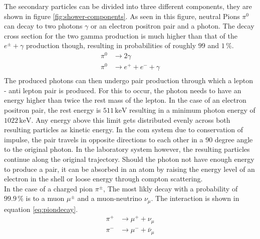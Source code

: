 \documentclass[abstract,toc,los,english,10pt,glossary,acronyms]{jluthesis}
\begin{document}
The secondary particles can be divided into three different components, they are shown in figure \ref{fig:shower-components}.
As seen in this figure, neutral Pions $\pi^0$ can decay to two photons $\gamma$ or an electron positron pair and a photon. The decay cross section for the two gamma production is much higher than that of the $e^\pm + \gamma$ production though, resulting in probabilities of roughly $99$ and $1\,\%$. 
\begin{equation}
	\begin{aligned}
		\pi^0 &\rightarrow 2\gamma \\
		\pi^0 &\rightarrow e^+ + e^- + \gamma \\
	\end{aligned}
\end{equation}
The produced photons can then undergo pair production through which a lepton - anti lepton pair is produced. For this to occur, the photon needs to have an energy higher than twice the rest mass of the lepton. In the case of an electron positron pair, the rest energy is $511\,\text{keV}$ resulting in a minimum photon energy of $1022\,\text{keV}$. Any energy above this limit gets distributed evenly across both resulting particles as kinetic energy. In the \acrfull{com} system due to conservation of impulse, the pair travels in opposite directions to each other in a 90 degree angle to the original photon. In the laboratory system however, the resulting particles continue along the original trajectory.
Should the photon not have enough energy to produce a pair, it can be absorbed in an atom by raising the energy level of an electron in the shell or loose energy through compton scattering.\\
In the case of a charged pion $\pi^\pm$, The most likly decay with a probability of $99.9\,\%$ is to a muon $\mu^\pm$ and a muon-neutrino $\nu_\mu$. The interaction is shown in equation \ref{eq:piondecay}.
\begin{equation}\label{eq:piondecay}
	\begin{aligned}
		\pi^+ &\rightarrow \mu^+ + \nu_\mu \\
		\pi^- &\rightarrow \mu^- + \bar{\nu}_\mu
	\end{aligned}
\end{equation}
\end{document}
